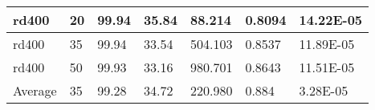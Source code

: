 \documentclass{llncs}
\begin{document}
\begin{center}
\begin{longtable}{|l|l|l|l|l|l|l|}
\hline	rd400	&	20	&	99.94	&	35.84	&	88.214	&	0.8094	&	14.22E-05	\\
\hline	rd400	&	35	&	99.94	&	33.54	&	504.103	&	0.8537	&	11.89E-05	\\
\hline	rd400	&	50	&	99.93	&	33.16	&	980.701	&	0.8643	&	11.51E-05	\\
\hline Average     & 35    &   99.28   &  34.72   &    220.980 &  0.884 & 3.28E-05 \\
\hline
\end{longtable}
\end{center}
\end{document}
